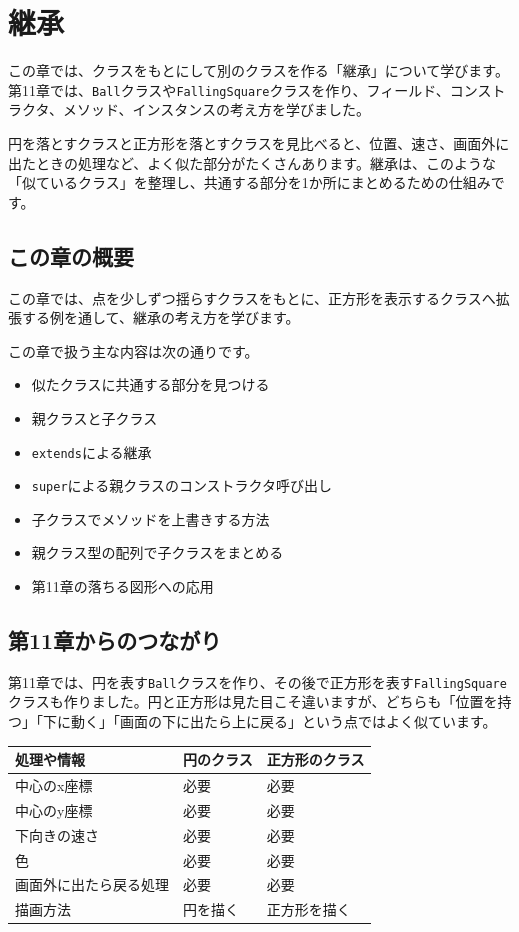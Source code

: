 \chapter{継承}
\label{chap:inheritance}

この章では、クラスをもとにして別のクラスを作る「継承」について学びます。第11章では、\texttt{Ball}クラスや\texttt{FallingSquare}クラスを作り、フィールド、コンストラクタ、メソッド、インスタンスの考え方を学びました。

円を落とすクラスと正方形を落とすクラスを見比べると、位置、速さ、画面外に出たときの処理など、よく似た部分がたくさんあります。継承は、このような「似ているクラス」を整理し、共通する部分を1か所にまとめるための仕組みです。

\section{この章の概要}

この章では、点を少しずつ揺らすクラスをもとに、正方形を表示するクラスへ拡張する例を通して、継承の考え方を学びます。

この章で扱う主な内容は次の通りです。

\begin{itemize}
    \item 似たクラスに共通する部分を見つける
    \item 親クラスと子クラス
    \item \texttt{extends}による継承
    \item \texttt{super}による親クラスのコンストラクタ呼び出し
    \item 子クラスでメソッドを上書きする方法
    \item 親クラス型の配列で子クラスをまとめる
    \item 第11章の落ちる図形への応用
\end{itemize}

\section{第11章からのつながり}

第11章では、円を表す\texttt{Ball}クラスを作り、その後で正方形を表す\texttt{FallingSquare}クラスも作りました。円と正方形は見た目こそ違いますが、どちらも「位置を持つ」「下に動く」「画面の下に出たら上に戻る」という点ではよく似ています。

\begin{center}
\begin{tabular}{lll}
\toprule
処理や情報 & 円のクラス & 正方形のクラス \\
\midrule
中心のx座標 & 必要 & 必要 \\
中心のy座標 & 必要 & 必要 \\
下向きの速さ & 必要 & 必要 \\
色 & 必要 & 必要 \\
画面外に出たら戻る処理 & 必要 & 必要 \\
描画方法 & 円を描く & 正方形を描く \\
\bottomrule
\end{tabular}
\end{center}

